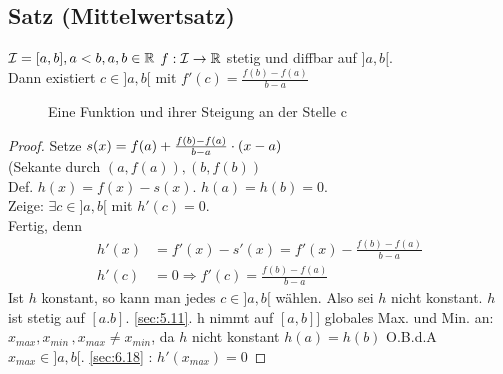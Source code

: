 \subsection{Satz (Mittelwertsatz)}\label{sec:6.19}
$\mathcal{I} = [a,b], a < b , a,b \in \mathbb{R}$\marginpar{Speziell: $f(a) =f(b) \Rightarrow \exists c \in ]a,b[$ mit $f'(c) = 0$ Satz von Rolle} $\\
f: \mathcal{I} \to \mathbb{R}$ stetig und diffbar auf $]a,b[$.\\
Dann existiert $c \in ]a,b[$ mit $f'(c) = \frac{f(b)-f(a)}{b-a}$
\begin{figure}[h!]
	\centering
	\caption{Eine Funktion und ihrer Steigung an der Stelle c}
\end{figure}
\begin{proof}
	Setze $s(x) = f(a) + \frac{f(b) -f(a)}{b-a} \cdot (x-a)$\\
	(Sekante durch $(a,f(a)),(b,f(b))$\\
	Def. $h(x) = f(x) - s(x)$. $h(a) = h(b) = 0$.\\
	Zeige: $\exists c \in ]a,b[ $ mit $h'(c) = 0$.\\
	Fertig, denn 
	\begin{align*}
		h'(x) &=f'(x) - s'(x)
		= f'(x) - \frac{f(b)-f(a)}{b-a}\\
		h'(c) &= 0 \Rightarrow f'(c) = \frac{f(b)-f(a)}{b-a} 
	\end{align*}
	Ist $h$ konstant, so kann man jedes $c \in ]a,b[$ wählen. Also sei $h$ nicht konstant. $h$ ist stetig auf $[a.b]$. \ref{sec:5.11}. h nimmt auf $[a,b]]$ globales Max. und Min. an: $x_{max}, x_{min}\, , x_{max} \ne x_{min}$, da $h$ nicht konstant $h(a) = h(b)$ O.B.d.A\\
	$x_{max} \in ]a,b[.$ \ref{sec:6.18} : $h'(x_{max}) = 0$
\end{proof}
